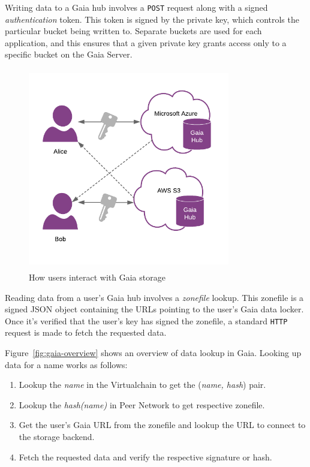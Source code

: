 		Writing data to a Gaia hub involves a \texttt{POST} request along with a signed \textit{authentication} token. This token is signed by the private key, which controls the particular bucket being written to. Separate buckets are used for each application, and this ensures that a given private key grants access only to a specific bucket on the Gaia Server.
		
		\begin{figure}[h]
			\centering
			\includegraphics[width=250pt, height=250pt]{figures/gaia-storage}
			\caption{\label{fig:gaia-storage} How users interact with Gaia storage\protect\cite{image:gaia:storage}}
		\end{figure}
		
		Reading data from a user's Gaia hub involves a \textit{zonefile} lookup. This zonefile is a signed JSON object containing the URLs pointing to the user's Gaia data locker. Once it's verified that the user's key has signed the zonefile, a standard \texttt{HTTP} request is made to fetch the requested data.
		
		Figure~\ref{fig:gaia-overview} shows an overview of data lookup in Gaia. Looking up data for a name works as follows:
		
		\begin{enumerate}
			\item Lookup the \textit{name} in the Virtualchain to get the (\textit{name, hash}) pair.
			\item Lookup the \textit{hash(name)} in Peer Network to get respective zonefile.
			\item Get the user's Gaia URL from the zonefile and lookup the URL to connect to the storage backend.
			\item Fetch the requested data and verify the respective signature or hash.
		\end{enumerate}
		
